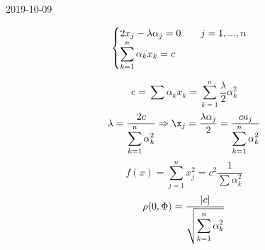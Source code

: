 \documentclass[main, 12pt, fleqn]{subfiles}
\begin{document}
\begin{lect} {2019-10-09}
\begin{Example}
\[\begin{cases}
		2x_j - \lambda \alpha_j = 0 \qquad j = 1, ..., n\\
		\displaystyle \sum_{k = 1}^n \alpha_k x_k = c \end{cases}\]

		\[c = \sum \alpha_k x_k = \sum_{k = 1}^n \frac{\lambda}{2} \alpha^2_k \]
		\[\lambda = \frac{2c}{\displaystyle \sum_{k = 1}^n  \alpha_k^2} \Ra
		\x_j = \frac{\lambda \alpha_j}{2} = \frac{c a_j}{\displaystyle \sum_{k = 1}^n \alpha_k^2}\]
		\[f(x) = \sum_{j = 1}^n x^2_j = c^2 \frac{1}{\displaystyle \sum \alpha_k^2} \]
		\[\rho(0, \Phi) = \frac{\left|c\right|}{\sqrt{\displaystyle \sum^n_{k = 1} \alpha_k^2 }}\]
	\end{Example}
\end{lect}
\end{document}
